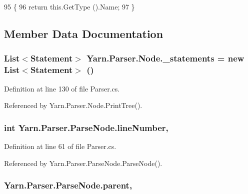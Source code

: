 \begin{DoxyCode}
95             \{
96                 \textcolor{keywordflow}{return} this.GetType ().Name;
97             \}
\end{DoxyCode}


\subsection{Member Data Documentation}
\hypertarget{a00128_ae910a20906be9b1964499efaefa48274}{
\subsubsection[{\-\_\-statements}]{\setlength{\rightskip}{0pt plus 5cm}List$<${\bf Statement}$>$ Yarn.\-Parser.\-Node.\-\_\-statements = new List$<${\bf Statement}$>$ ()\hspace{0.3cm}{\ttfamily [private]}}}\label{a00128_ae910a20906be9b1964499efaefa48274}


Definition at line 130 of file Parser.\-cs.



Referenced by Yarn.\-Parser.\-Node.\-Print\-Tree().

\hypertarget{a00138_a18b493382de0fde5b4299c1bd2250075}{
\subsubsection[{line\-Number}]{\setlength{\rightskip}{0pt plus 5cm}int Yarn.\-Parser.\-Parse\-Node.\-line\-Number\hspace{0.3cm}{\ttfamily [package]}, {\ttfamily [inherited]}}}\label{a00138_a18b493382de0fde5b4299c1bd2250075}


Definition at line 61 of file Parser.\-cs.



Referenced by Yarn.\-Parser.\-Parse\-Node.\-Parse\-Node().

\hypertarget{a00138_af313a82103fcc2ff5a177dbb06b92f7b}{
\subsubsection[{parent}]{ Yarn.\-Parser.\-Parse\-Node.\-parent\hspace{0.3cm}{\ttfamily [package]}, {\ttfamily [inherited]}}}\label{a00138_af313a82103fcc2ff5a177dbb06b92f7b}


